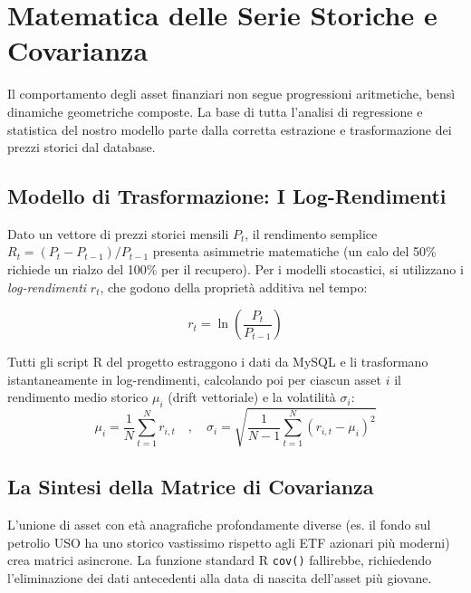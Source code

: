 \chapter{Matematica delle Serie Storiche e Covarianza}

Il comportamento degli asset finanziari non segue progressioni aritmetiche, bensì dinamiche geometriche composte. La base di tutta l'analisi di regressione e statistica del nostro modello parte dalla corretta estrazione e trasformazione dei prezzi storici dal database.

\section{Modello di Trasformazione: I Log-Rendimenti}
Dato un vettore di prezzi storici mensili $P_t$, il rendimento semplice $R_t = (P_t - P_{t-1})/P_{t-1}$ presenta asimmetrie matematiche (un calo del 50\% richiede un rialzo del 100\% per il recupero). Per i modelli stocastici, si utilizzano i \emph{log-rendimenti} $r_t$, che godono della proprietà additiva nel tempo:

\begin{equation}
r_t = \ln\left(\frac{P_t}{P_{t-1}}\right)
\end{equation}

Tutti gli script R del progetto estraggono i dati da MySQL e li trasformano istantaneamente in log-rendimenti, calcolando poi per ciascun asset $i$ il rendimento medio storico $\mu_i$ (drift vettoriale) e la volatilità $\sigma_i$:
\begin{equation}
\mu_i = \frac{1}{N} \sum_{t=1}^{N} r_{i,t} \quad , \quad \sigma_i = \sqrt{\frac{1}{N-1} \sum_{t=1}^{N} (r_{i,t} - \mu_i)^2}
\end{equation}

\section{La Sintesi della Matrice di Covarianza}
L'unione di asset con età anagrafiche profondamente diverse (es. il fondo sul petrolio USO ha uno storico vastissimo rispetto agli ETF azionari più moderni) crea matrici asincrone. La funzione standard R \texttt{cov()} fallirebbe, richiedendo l'eliminazione dei dati antecedenti alla data di nascita dell'asset più giovane.

